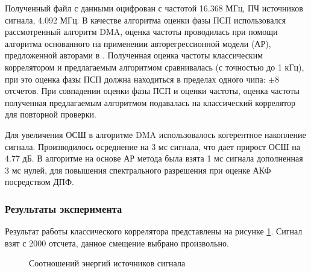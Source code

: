 Полученный файл с данными оцифрован с частотой 16.368 МГц, ПЧ источников сигнала, 4.092 МГц. В качестве алгоритма оценки фазы ПСП использовался рассмотренный алгоритм DMA,
оценка частоты проводилась при помощи алгоритма основанного на применении авторегрессионной модели (АР), предложенной авторами в \cite{FIXME-otchet}. Полученная оценка
частоты классическим коррелятором и предлагаемым алгоритмом сравнивалась (с точностью до 1 кГц), при это оценка фазы ПСП должна находиться в пределах одного чипа: ${\pm 8}$
отсчетов. При совпадении оценки фазы ПСП и оценки частоты, оценка частоты полученная предлагаемым алгоритмом подавалась на классический коррелятор для повторной проверки.

Для увеличения ОСШ в алгоритме DMA использовалось когерентное накопление сигнала. Производилось осреднение на 3 мс сигнала, что дает прирост ОСШ на 4.77 дБ.
В алгоритме на основе АР метода была взята 1 мс сигнала дополненная 3 мс нулей, для повышения спектрального разрешения при оценке АКФ посредством ДПФ.

\subsubsection{Результаты эксперимента}

Результат работы классического коррелятора представлены на рисунке \ref{pic:16mhz_sats_all}. Сигнал взят с 2000 отсчета, данное смещение выбрано произвольно.
\begin{figure}[H]
\center{}
	\caption{Соотношений энергий источников сигнала}
	\label{pic:16mhz_sats_all}
\end{figure}

